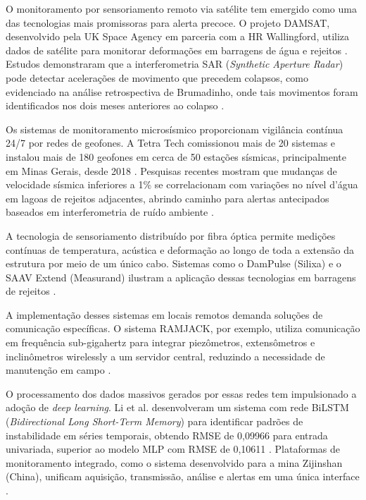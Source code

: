 O monitoramento por sensoriamento remoto via satélite tem emergido como uma das tecnologias mais promissoras para alerta precoce. O projeto DAMSAT, desenvolvido pela UK Space Agency em parceria com a HR Wallingford, utiliza dados de satélite para monitorar deformações em barragens de água e rejeitos \cite{hrwallingford2021damsat}. Estudos demonstraram que a interferometria SAR (\textit{Synthetic Aperture Radar}) pode detectar acelerações de movimento que precedem colapsos, como evidenciado na análise retrospectiva de Brumadinho, onde tais movimentos foram identificados nos dois meses anteriores ao colapso \cite{naturecomm2020advanced}.

Os sistemas de monitoramento microsísmico proporcionam vigilância contínua 24/7 por redes de geofones. A Tetra Tech comissionou mais de 20 sistemas e instalou mais de 180 geofones em cerca de 50 estações sísmicas, principalmente em Minas Gerais, desde 2018 \cite{tetratech2023mitigating}. Pesquisas recentes mostram que mudanças de velocidade sísmica inferiores a 1\% se correlacionam com variações no nível d'água em lagoas de rejeitos adjacentes, abrindo caminho para alertas antecipados baseados em interferometria de ruído ambiente \cite{naturecomm2022monitoring}.

A tecnologia de sensoriamento distribuído por fibra óptica permite medições contínuas de temperatura, acústica e deformação ao longo de toda a extensão da estrutura por meio de um único cabo. Sistemas como o DamPulse (Silixa) e o SAAV Extend (Measurand) ilustram a aplicação dessas tecnologias em barragens de rejeitos \cite{silixa2024dampulse, rstinstruments2022tailings}.

A implementação desses sistemas em locais remotos demanda soluções de comunicação específicas. O sistema RAMJACK, por exemplo, utiliza comunicação em frequência sub-gigahertz para integrar piezômetros, extensômetros e inclinômetros wirelessly a um servidor central, reduzindo a necessidade de manutenção em campo \cite{ramjack2022tailings}.

O processamento dos dados massivos gerados por essas redes tem impulsionado a adoção de \textit{deep learning}. Li et al. desenvolveram um sistema com rede BiLSTM (\textit{Bidirectional Long Short-Term Memory}) para identificar padrões de instabilidade em séries temporais, obtendo RMSE de 0,09966 para entrada univariada, superior ao modelo MLP com RMSE de 0,10611 \cite{jing2022monitoring}. Plataformas de monitoramento integrado, como o sistema desenvolvido para a mina Zijinshan (China), unificam aquisição, transmissão, análise e alertas em uma única interface \cite{frontiers2022visualization}.

